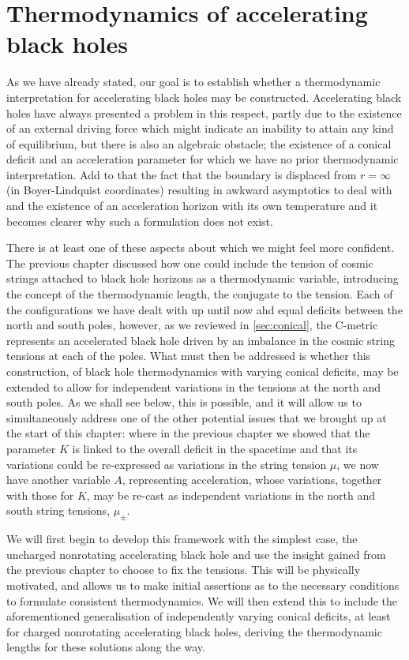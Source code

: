 \documentclass[
twoside,
openright,
frontopenright,
]{dmathesis}
\begin{document}
\chapter{Thermodynamics of accelerating black holes}
\label{cha:therm-accel-black}

As we have already stated, our goal is to establish whether a thermodynamic
interpretation for accelerating black holes may be constructed. Accelerating
black holes have always presented a problem in this respect, partly due to the
existence of an external driving force which might indicate an inability to
attain any kind of equilibrium, but there is also an algebraic obstacle; the
existence of a conical deficit and an acceleration parameter for which we have
no prior thermodynamic interpretation. Add to that the fact that the boundary is
displaced from $r = \infty$ (in Boyer-Lindquist coordinates) resulting in
awkward asymptotics to deal with and the existence of an acceleration horizon
with its own temperature and it becomes clearer why such a formulation does not
exist.

There is at least one of these aspects about which we might feel more
confident. The previous chapter discussed how one could include the tension of
cosmic strings attached to black hole horizons as a thermodynamic variable,
introducing the concept of the thermodynamic length, the conjugate to the
tension. Each of the configurations we have dealt with up until now ahd equal
deficits between the north and south poles, however, as we reviewed in
\cref{sec:conical}, the C-metric represents an accelerated black hole driven by
an imbalance in the cosmic string tensions at each of the poles. What must then
be addressed is whether this construction, of black hole thermodynamics with
varying conical deficits, may be extended to allow for independent variations in
the tensions at the north and south poles. As we shall see below, this is
possible, and it will allow us to simultaneously address one of the other
potential issues that we brought up at the start of this chapter: where in the
previous chapter we showed that the parameter $K$ is linked to the overall
deficit in the spacetime and that its variations could be re-expressed as
variations in the string tension $\mu$, we now have another variable $A$,
representing acceleration, whose variations, together with those for $K$, may be
re-cast as independent variations in the north and south string tensions,
$\mu_\pm$.

We will first begin to develop this framework with the simplest case, the
uncharged nonrotating accelerating black hole and use the insight gained from
the previous chapter to choose to fix the tensions. This will be physically
motivated, and allows us to make initial assertions as to the necessary
conditions to formulate consistent thermodynamics. We will then extend this
to include the aforementioned generalisation of independently varying conical
deficits, at least for charged nonrotating accelerating black holes, deriving
the thermodynamic lengths for these solutions along the way.
\end{document}

